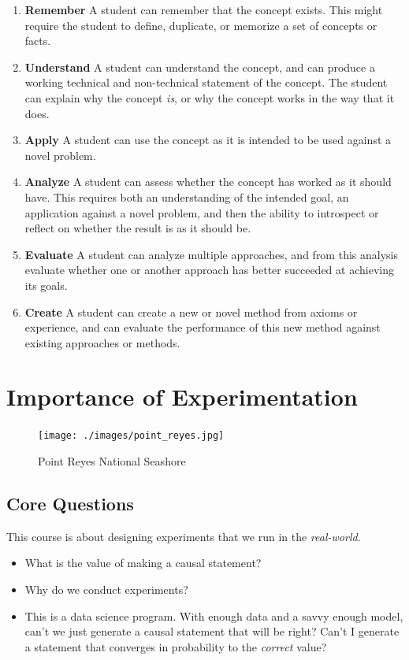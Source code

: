 \documentclass[
]{article}
\providecommand{\tightlist}{%
  \setlength{\itemsep}{0pt}\setlength{\parskip}{0pt}}
\begin{document}
\begin{enumerate}
\def\labelenumi{\arabic{enumi}.}
\tightlist
\item
  \textbf{Remember} A student can remember that the concept exists. This might require the student to define, duplicate, or memorize a set of concepts or facts.
\item
  \textbf{Understand} A student can understand the concept, and can produce a working technical and non-technical statement of the concept. The student can explain why the concept \emph{is}, or why the concept works in the way that it does.
\item
  \textbf{Apply} A student can use the concept as it is intended to be used against a novel problem.
\item
  \textbf{Analyze} A student can assess whether the concept has worked as it should have. This requires both an understanding of the intended goal, an application against a novel problem, and then the ability to introspect or reflect on whether the result is as it should be.
\item
  \textbf{Evaluate} A student can analyze multiple approaches, and from this analysis evaluate whether one or another approach has better succeeded at achieving its goals.
\item
  \textbf{Create} A student can create a new or novel method from axioms or experience, and can evaluate the performance of this new method against existing approaches or methods.
\end{enumerate}

\hypertarget{importance-of-experimentation}{%
\section{Importance of Experimentation}\label{importance-of-experimentation}}

\begin{figure}
\centering
\texttt{[image: ./images/point\_reyes.jpg]}
\caption{Point Reyes National Seashore}
\end{figure}

\hypertarget{core-questions}{%
\subsection{Core Questions}\label{core-questions}}

This course is about designing experiments that we run in the \emph{real-world}.

\begin{itemize}
\tightlist
\item
  What is the value of making a causal statement?
\item
  Why do we conduct experiments?
\item
  This is a data science program. With enough data and a savvy enough model, can't we just generate a causal statement that will be right? Can't I generate a statement that converges in probability to the \emph{correct} value?
\end{itemize}
\end{document}
